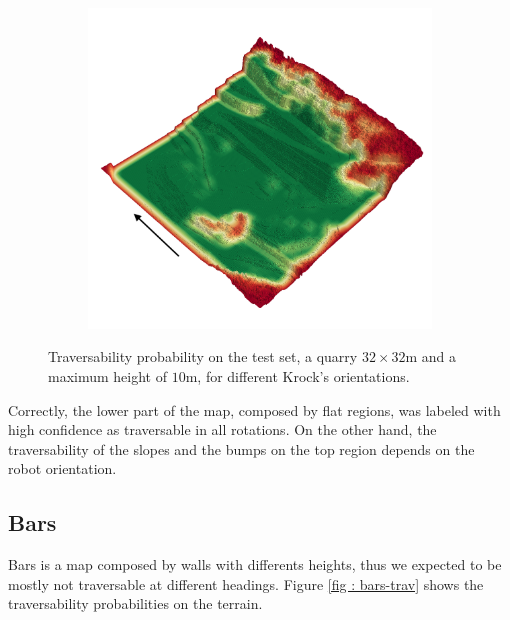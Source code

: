 \documentclass[../document.tex]{subfiles}
\begin{document}
\begin{figure} [htbp]
\begin{subfigure}[b]{0.45\textwidth}
\end{subfigure}
\begin{subfigure}[b]{0.45\textwidth}
    \includegraphics[width=\linewidth]{../img/4/traversability/quarry/-180.png}  
\end{subfigure}
\caption{Traversability probability on the test set, a quarry $32\times 32$m and a maximum height of $10$m, for different Krock's orientations. }
\label{fig : quarry-trav}
\end{figure}
 Correctly, the lower part of the map, composed by flat regions, was labeled with high confidence as traversable in all rotations. On the other hand, the traversability of the slopes and the bumps on the top region depends on the robot orientation.

\subsection{Bars}
Bars is a map composed by walls with differents heights, thus we expected to be mostly not traversable at different headings. Figure \ref{fig : bars-trav} shows the traversability probabilities on the terrain.
\end{document}
